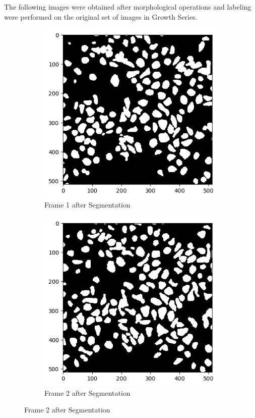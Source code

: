\documentclass{article}
\begin{document}
\clearpage
\newline
The following images were obtained after morphological operations and labeling were performed on the original set of images in Growth Series. 
\begin{figure}[h!]
  \centering
  \begin{subfigure}{0.4\textwidth}
    \includegraphics[width=\linewidth]{Report/Appendix_Images/Segmentation-B-Growth/frame_1.png}
    \caption*{Frame 1 after Segmentation}
  \end{subfigure}
  \hfill
  \begin{subfigure}{0.4\textwidth}
    \includegraphics[width=\linewidth]{Report/Appendix_Images/Segmentation-B-Growth/frame_2.png}
    \caption*{Frame 2 after Segmentation}
  \end{subfigure}


\end{figure}
\end{document}
